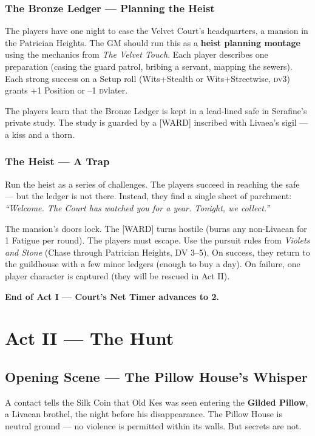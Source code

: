 \documentclass[10pt,twoside]{book}
\newcommand{\tag}[1]{\textsc{[#1]}}
\newcommand{\dv}{\textsc{dv}}
\begin{document}
\subsection{The Bronze Ledger --- Planning the Heist}

The players have one night to case the Velvet Court's headquarters, a mansion in the Patrician Heights. The GM should run this as a \textbf{heist planning montage} using the mechanics from \textit{The Velvet Touch}. Each player describes one preparation (casing the guard patrol, bribing a servant, mapping the sewers). Each strong success on a Setup roll (Wits+Stealth or Wits+Streetwise, \dv 3) grants +1 Position or --1 \dv later.

The players learn that the Bronze Ledger is kept in a lead-lined safe in Serafine's private study. The study is guarded by a \tag{WARD} inscribed with Livaea's sigil --- a kiss and a thorn.

\subsection{The Heist --- A Trap}

Run the heist as a series of challenges. The players succeed in reaching the safe --- but the ledger is not there. Instead, they find a single sheet of parchment: \textit{``Welcome. The Court has watched you for a year. Tonight, we collect.''}

The mansion's doors lock. The \tag{WARD} turns hostile (burns any non-Livaean for 1 Fatigue per round). The players must escape. Use the pursuit rules from \textit{Violets and Stone} (Chase through Patrician Heights, DV 3--5). On success, they return to the guildhouse with a few minor ledgers (enough to buy a day). On failure, one player character is captured (they will be rescued in Act II).

\textbf{End of Act I --- Court's Net Timer advances to 2.}

\chapter{Act II --- The Hunt}

\section{Opening Scene --- The Pillow House's Whisper}

A contact tells the Silk Coin that Old Kes was seen entering the \textbf{Gilded Pillow}, a Livaean brothel, the night before his disappearance. The Pillow House is neutral ground --- no violence is permitted within its walls. But secrets are not.
\end{document}
